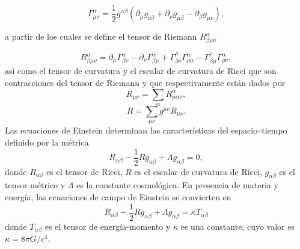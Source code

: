 \documentclass[a4paper,openright,10pt, oneside, final]{book}
\begin{document}
\begin{equation*}
\Gamma^{\alpha}_{\mu \nu} = 
\frac{1}{2}g^{\alpha \beta}\left(\partial_{\mu}g_{\nu \beta} +
\partial_{\nu}g_{\mu \beta} - \partial_{\beta}g_{\mu \nu}\right), 
\end{equation*}

a partir de los cuales se define el tensor de Riemann $R^{\alpha}_{\beta \mu \nu}$

\begin{equation*}
R^{\alpha}_{\beta \mu \nu}
=
\partial_{\mu}\Gamma^{\alpha}_{\beta \nu}
-
\partial_{\nu}\Gamma^{\alpha}_{\beta \mu}
+
\Gamma^{\rho}_{\beta \nu}\Gamma^{\alpha}_{\rho \mu}
-
\Gamma^{\rho}_{\beta \mu}\Gamma^{\alpha}_{\rho \nu},
\end{equation*}
así como el tensor de curvatura y el escalar de curvatura de Ricci que son contracciones del tensor de Riemann y que respectivamente están dados por
\begin{equation*}
R_{\mu \nu} = \sum_{\alpha}R^{\alpha}_{\mu \alpha \nu},
\end{equation*}
\begin{equation*}
R = \sum_{\mu \nu}g^{\mu \nu}R_{\mu \nu}.
\end{equation*}
Las ecuaciones de Einstein determinan las características del espacio--tiempo definido por la métrica
\begin{equation}
R_{\alpha \beta} - \frac{1}{2} R g_{\alpha \beta} + \Lambda g_{\alpha \beta} = 0,\label{eqn 1.12}
\end{equation}
donde $R_{\alpha \beta}$ es el tensor de Ricci, $R$ es el escalar de curvatura de Ricci, $g_{\alpha \beta}$ es el tensor métrico y $\Lambda$ es la constante cosmológica. En presencia de materia y energía, las ecuaciones de campo de Einstein se convierten en 
\begin{equation}
R_{\alpha \beta} - \frac{1}{2} R g_{\alpha \beta} + \Lambda g_{\alpha \beta} = \kappa T_{\alpha \beta}\label{eqn 1.13}
\end{equation}
donde $T_{\alpha \beta}$ es el tensor de energía-momento y $\kappa$ es una constante, cuyo valor es $\kappa = 8 \pi G / c^{4}$.

\end{document}
